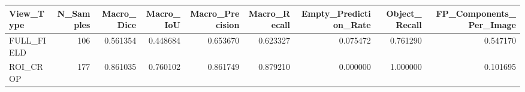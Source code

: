 \begin{tabular}{lrrrrrrrr}
\toprule
View_Type & N_Samples & Macro_Dice & Macro_IoU & Macro_Precision & Macro_Recall & Empty_Prediction_Rate & Object_Recall & FP_Components_Per_Image \\
\midrule
FULL_FIELD & 106 & 0.561354 & 0.448684 & 0.653670 & 0.623327 & 0.075472 & 0.761290 & 0.547170 \\
ROI_CROP & 177 & 0.861035 & 0.760102 & 0.861749 & 0.879210 & 0.000000 & 1.000000 & 0.101695 \\
\bottomrule
\end{tabular}
